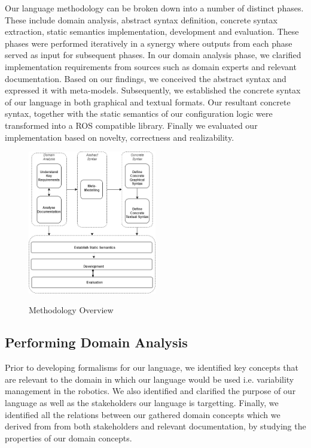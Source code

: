 \documentclass[conference]{IEEEtran}
\begin{document}
Our language methodology can be broken down into a number of distinct phases. These include domain analysis, abstract syntax definition, concrete syntax extraction, static semantics implementation, development and evaluation. These phases were performed iteratively in a synergy where outputs from each phase served as input for subsequent phases. In our domain analysis phase, we clarified implementation requirements from sources such as domain experts and relevant documentation. Based on our findings, we conceived the abstract syntax and expressed it with meta-models. Subsequently, we established the concrete syntax of our language in both graphical and textual formats. Our resultant concrete syntax, together with the static semantics of our configuration logic were transformed into a ROS compatible library. Finally we evaluated our implementation based on novelty, correctness and realizability.

\begin{figure}[H]
\caption{Methodology Overview}
\centering
\includegraphics[width=0.5\textwidth]{diagrams/methods.png}
\label{methover}
\end{figure}

\subsection{Performing Domain Analysis}
Prior to developing formalisms for our language, we identified key concepts that are relevant to the domain in which our language would be used i.e. variability management in the robotics. We also identified and clarified the purpose of our language as well as the stakeholders our language is targetting. Finally, we identified all the relations between our gathered domain concepts which we derived from  from both stakeholders and relevant documentation, by studying the properties of our domain concepts.
\end{document}
